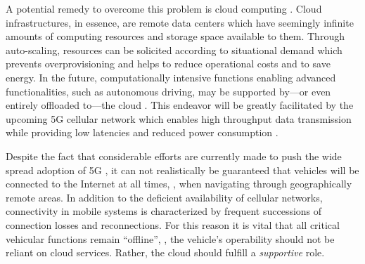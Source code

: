 A potential remedy to overcome this problem is cloud computing \cite{mell2011nist}. Cloud infrastructures, in essence, are remote data centers which have seemingly infinite amounts of computing resources and storage space available to them. Through auto-scaling, resources can be solicited according to situational demand which prevents overprovisioning and helps to reduce operational costs and to save energy. In the future, computationally intensive functions enabling advanced functionalities, such as autonomous driving, may be supported by---or even entirely offloaded to---the cloud \cite{liu2017unified}. This endeavor will be greatly facilitated by the upcoming 5G cellular network which enables high throughput data transmission while providing low latencies and reduced power consumption \cite{andrews2014will}.

Despite the fact that considerable efforts are currently made to push the wide spread adoption of 5G \cite{festag2016studie}, it can not realistically be guaranteed that vehicles will be connected to the Internet at all times, \eg , when navigating through geographically remote areas. In addition to the deficient availability of cellular networks, connectivity in mobile systems is characterized by frequent successions of connection losses and reconnections. For this reason it is vital that all critical vehicular functions remain ``offline'', \ie , the vehicle's operability should not be reliant on cloud services. Rather, the cloud should fulfill a \emph{supportive} role.

%
%
%
%
%
%
%
%
%
%

